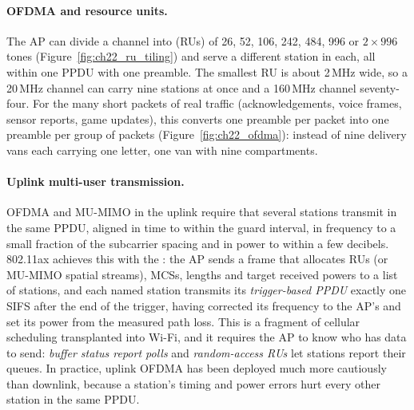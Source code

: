 \paragraph{OFDMA and resource units.} The AP can divide a channel into  (RUs)
of 26, 52, 106, 242, 484, 996 or $2\times996$ tones (Figure~\ref{fig:ch22_ru_tiling}) and serve a
different station in each, all within one PPDU with one preamble. The smallest RU is about 2\,MHz
wide, so a 20\,MHz channel can carry nine stations at once and a 160\,MHz channel seventy-four. For
the many short packets of real traffic (acknowledgements, voice frames, sensor reports, game
updates), this converts one preamble per packet into one preamble per group of packets
(Figure~\ref{fig:ch22_ofdma}): instead of nine delivery vans each carrying one letter, one van with
nine compartments.


\paragraph{Uplink multi-user transmission.} OFDMA and MU-MIMO in the uplink require that several
stations transmit in the same PPDU, aligned in time to within the guard interval, in frequency to a
small fraction of the subcarrier spacing and in power to within a few decibels. 802.11ax achieves
this with the : the AP sends a frame that allocates RUs (or MU-MIMO spatial
streams), MCSs, lengths and target received powers to a list of stations, and each named station
transmits its \emph{trigger-based PPDU} exactly one SIFS after the end of the trigger, having
corrected its frequency to the AP's and set its power from the measured path loss. This is a
fragment of cellular scheduling transplanted into Wi-Fi, and it requires the AP to know who has
data to send: \emph{buffer status report polls} and \emph{random-access RUs} let stations report
their queues. In practice, uplink OFDMA has been deployed much more cautiously than downlink,
because a station's timing and power errors hurt every other station in the same PPDU.

